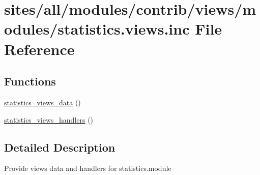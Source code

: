 \hypertarget{statistics_8views_8inc}{
\section{sites/all/modules/contrib/views/modules/statistics.views.inc File Reference}
\label{statistics_8views_8inc}
}
\subsection*{Functions}
\begin{CompactItemize}
\item 
\hyperlink{group__views__statistics__module_g9300ca230bb34c089e59aa4c0ff3e1dc}{statistics\_\-views\_\-data} ()
\item 
\hyperlink{group__views__statistics__module_g0f99562f2c2af4067356add59238b906}{statistics\_\-views\_\-handlers} ()
\end{CompactItemize}


\subsection{Detailed Description}
Provide views data and handlers for statistics.module 